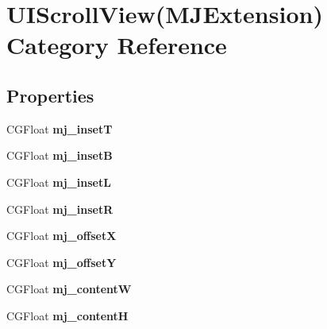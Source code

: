 \hypertarget{category_u_i_scroll_view_07_m_j_extension_08}{}\section{U\+I\+Scroll\+View(M\+J\+Extension) Category Reference}
\label{category_u_i_scroll_view_07_m_j_extension_08}
\subsection*{Properties}
\begin{DoxyCompactItemize}
\item 
\mbox{\label{category_u_i_scroll_view_07_m_j_extension_08_af8c7de3ca65dcb3f46a6c881442c361b}} 
C\+G\+Float {\bfseries mj\+\_\+insetT}
\item 
\mbox{\label{category_u_i_scroll_view_07_m_j_extension_08_a37b9db9a819ee6153c1c50ef839a9746}} 
C\+G\+Float {\bfseries mj\+\_\+insetB}
\item 
\mbox{\label{category_u_i_scroll_view_07_m_j_extension_08_a8f35488403122ec7c5addaa03100b370}} 
C\+G\+Float {\bfseries mj\+\_\+insetL}
\item 
\mbox{\label{category_u_i_scroll_view_07_m_j_extension_08_a56803e10a3f5434864e036de6e6133da}} 
C\+G\+Float {\bfseries mj\+\_\+insetR}
\item 
\mbox{\label{category_u_i_scroll_view_07_m_j_extension_08_a36cb777af0d4b5e35a75e9c267afb7ea}} 
C\+G\+Float {\bfseries mj\+\_\+offsetX}
\item 
\mbox{\label{category_u_i_scroll_view_07_m_j_extension_08_a6019ae4e729daab6788c93671e4faa4b}} 
C\+G\+Float {\bfseries mj\+\_\+offsetY}
\item 
\mbox{\label{category_u_i_scroll_view_07_m_j_extension_08_a4e0a2e502020f005dae469fcf8f51625}} 
C\+G\+Float {\bfseries mj\+\_\+contentW}
\item 
\mbox{\label{category_u_i_scroll_view_07_m_j_extension_08_a2ea9bb16e0c74a0d2cb55e3308934f68}} 
C\+G\+Float {\bfseries mj\+\_\+contentH}
\end{DoxyCompactItemize}


